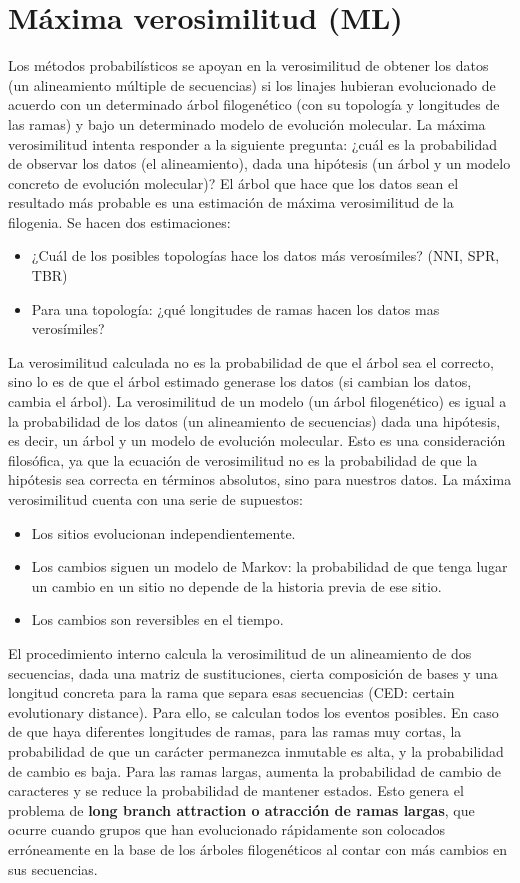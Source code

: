 \chapter{Máxima verosimilitud (ML)}
Los métodos probabilísticos se apoyan en la verosimilitud de obtener los datos (un alineamiento múltiple de secuencias) si los linajes hubieran evolucionado de acuerdo con un determinado árbol filogenético (con su topología y longitudes de las ramas) y bajo un determinado modelo de evolución molecular. La máxima verosimilitud intenta responder a la siguiente pregunta: ¿cuál es la probabilidad de observar los datos (el alineamiento), dada una hipótesis (un árbol y un modelo concreto de evolución molecular)? El árbol que hace que los datos sean el resultado más probable es una estimación de máxima verosimilitud de la filogenia. Se hacen dos estimaciones:
\begin{itemize}
\item ¿Cuál de los posibles topologías hace los datos más verosímiles? (NNI, SPR, TBR)
\item Para una topología: ¿qué longitudes de ramas hacen los datos mas verosímiles?
\end{itemize}

La verosimilitud calculada no es la probabilidad de que el árbol sea el correcto, sino lo es de que el árbol estimado generase los datos (si cambian los datos, cambia el árbol). La verosimilitud de un modelo (un árbol filogenético) es igual a la probabilidad de los datos (un alineamiento de secuencias) dada una hipótesis, es decir, un árbol y un modelo de evolución molecular. Esto es una consideración filosófica, ya que la ecuación de verosimilitud no es la probabilidad de que la hipótesis sea correcta en términos absolutos, sino para nuestros datos. La máxima verosimilitud cuenta con una serie de supuestos:
\begin{itemize}
\item Los sitios evolucionan independientemente.
\item Los cambios siguen un modelo de Markov: la probabilidad de que tenga lugar un cambio en un sitio no depende de la historia previa de ese sitio.
\item Los cambios son reversibles en el tiempo.
\end{itemize}

El procedimiento interno calcula la verosimilitud de un alineamiento de dos secuencias, dada una matriz de sustituciones, cierta composición de bases y una longitud concreta para la rama que separa esas secuencias (CED: certain evolutionary distance). Para ello, se calculan todos los eventos posibles. En caso de que haya diferentes longitudes de ramas, para las ramas muy cortas, la probabilidad de que un carácter permanezca inmutable es alta, y la probabilidad de cambio es baja. Para las ramas largas, aumenta la probabilidad de cambio de caracteres y se reduce la probabilidad de mantener estados. Esto genera el problema de \textbf{long branch attraction o atracción de ramas largas}, que ocurre cuando grupos que han evolucionado rápidamente son colocados erróneamente en la base de los árboles filogenéticos al contar con más cambios en sus secuencias.

